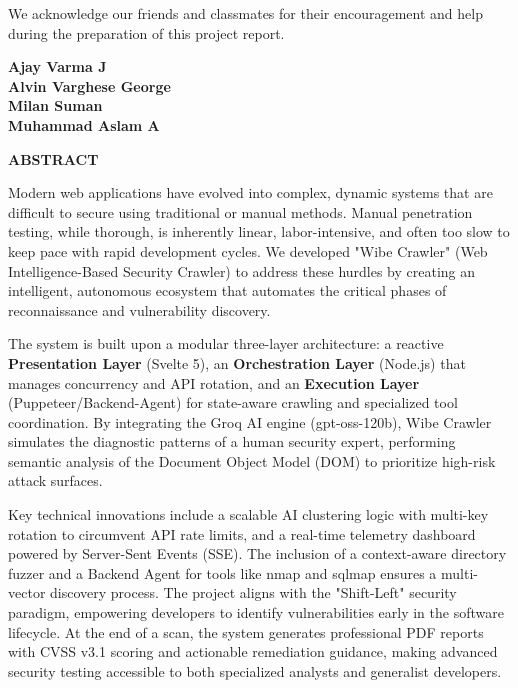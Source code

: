 \documentclass[12pt,oneside,a4paper]{book}
\begin{document}
\vspace*{0.5cm}\noindent
We acknowledge our friends and classmates for their encouragement and help during the preparation of this project report.

\vspace*{2cm}
\begin{flushright}
\begin{minipage}{0.3\textwidth}
    \textbf{Ajay Varma J\\
    Alvin Varghese George \\
    Milan Suman \\
    Muhammad Aslam A}
    \end{minipage}
\end{flushright}


\newpage
\thispagestyle{empty}

\begin{center}
  {\Large \bf ABSTRACT}\\[0.5cm]
\end{center}


\begingroup
\setlength{\parindent}{0pt}%
\setlength{\parskip}{6pt}%
\justifying

Modern web applications have evolved into complex, dynamic systems that are difficult to secure using traditional or manual methods. Manual penetration testing, while thorough, is inherently linear, labor-intensive, and often too slow to keep pace with rapid development cycles. We developed "Wibe Crawler" (Web Intelligence-Based Security Crawler) to address these hurdles by creating an intelligent, autonomous ecosystem that automates the critical phases of reconnaissance and vulnerability discovery. 

The system is built upon a modular three-layer architecture: a reactive \textbf{Presentation Layer} (Svelte 5), an \textbf{Orchestration Layer} (Node.js) that manages concurrency and API rotation, and an \textbf{Execution Layer} (Puppeteer/Backend-Agent) for state-aware crawling and specialized tool coordination. By integrating the Groq AI engine (gpt-oss-120b), Wibe Crawler simulates the diagnostic patterns of a human security expert, performing semantic analysis of the Document Object Model (DOM) to prioritize high-risk attack surfaces. 

Key technical innovations include a scalable AI clustering logic with multi-key rotation to circumvent API rate limits, and a real-time telemetry dashboard powered by Server-Sent Events (SSE). The inclusion of a context-aware directory fuzzer and a Backend Agent for tools like nmap and sqlmap ensures a multi-vector discovery process. The project aligns with the "Shift-Left" security paradigm, empowering developers to identify vulnerabilities early in the software lifecycle. At the end of a scan, the system generates professional PDF reports with CVSS v3.1 scoring and actionable remediation guidance, making advanced security testing accessible to both specialized analysts and generalist developers.
\end{document}
